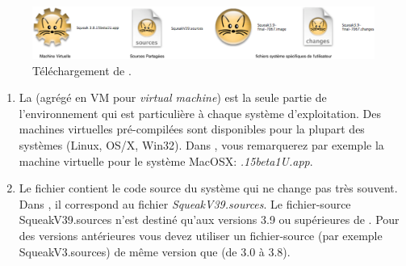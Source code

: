 \documentclass[a4paper,10pt,twoside]{book}
\begin{document}
\begin{figure}[htb]
\centerline {\includegraphics[width=\textwidth]{annotatedDownload}}
\caption{Téléchargement de \sq. \label{fig:download}}
\end{figure}

\begin{enumerate}


\item La  (agr\'eg\'e en VM pour
  \emph{virtual machine}) est la seule partie de l'environnement qui
  est particulière à chaque système d'exploitation. Des machines
  virtuelles pré-compilées sont disponibles pour la plupart des
  systèmes (Linux, OS/X, Win32). Dans , vous
  remarquerez par exemple la machine virtuelle pour le syst\`eme MacOSX: \textit{.15beta1U.app}.


  \item Le fichier  contient le code source du système
    \sq qui ne change pas tr\`es souvent. Dans , il
    correspond au fichier \emph{SqueakV39.sources}. Le fichier-source SqueakV39.sources n'est destiné qu'aux versions 3.9 ou supérieures de \sq. Pour des versions antérieures vous devez utiliser un fichier-source (par exemple SqueakV3.sources) de même version que \sq (de 3.0 à 3.8). 


\end{enumerate}
\end{document}
